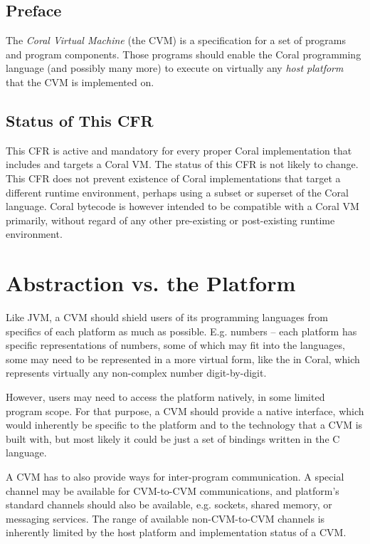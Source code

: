 
\section*{Preface}

The {\em Coral Virtual Machine} (the CVM) is a specification for a set of programs and program components. Those programs should enable the Coral programming language (and possibly many more) to execute on virtually any {\em host platform} that the CVM is implemented on. 




\section*{Status of This CFR}

This CFR is active and mandatory for every proper Coral implementation that includes and targets a Coral VM. The status of this CFR is not likely to change. This CFR does not prevent existence of Coral implementations that target a different runtime environment, perhaps using a subset or superset of the Coral language. Coral bytecode is however intended to be compatible with a Coral VM primarily, without regard of any other pre-existing or post-existing runtime environment. 






\chapter{Abstraction vs. the Platform}

Like JVM, a CVM should shield users of its programming languages from specifics of each platform as much as possible. E.g. numbers -- each platform has specific representations of numbers, some of which may fit into the languages, some may need to be represented in a more virtual form, like the  in Coral, which represents virtually any non-complex number digit-by-digit. 

However, users may need to access the platform natively, in some limited program scope. For that purpose, a CVM should provide a native interface, which would inherently be specific to the platform and to the technology that a CVM is built with, but most likely it could be just a set of bindings written in the C language. 

A CVM has to also provide ways for inter-program communication. A special channel may be available for CVM-to-CVM communications, and platform's standard channels should also be available, e.g. sockets, shared memory, or messaging services. The range of available non-CVM-to-CVM channels is inherently limited by the host platform and implementation status of a CVM. 





